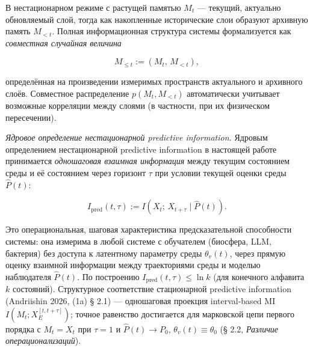 \documentclass[pdflatex,sn-mathphys-ay]{sn-jnl}
\providecommand{\lt}{<}\providecommand{\gt}{>}
\begin{document}
В нестационарном режиме с растущей памятью \(M_t\) --- текущий, актуально обновляемый слой, тогда как накопленные исторические слои образуют архивную память \(M_{\lt t}\). Полная информационная структура системы формализуется как \emph{совместная случайная величина}



\[M_{\le t} := (M_t,\, M_{\lt t}),\]



определённая на произведении измеримых пространств актуального и архивного слоёв. Совместное распределение \(p(M_t, M_{\lt t})\) автоматически учитывает возможные корреляции между слоями (в частности, при их физическом пересечении).



\emph{Ядровое определение нестационарной predictive information.} Ядровым определением нестационарной predictive information в настоящей работе принимается \emph{одношаговая взаимная информация} между текущим состоянием среды и её состоянием через горизонт \(\tau\) при условии текущей оценки среды \(\hat P(t)\):



\begin{equation}I_{\text{pred}}(t, \tau) := I\!\left(X_t;\, X_{t+\tau} \mid \hat P(t)\right). \tag{4}\end{equation}



Это операциональная, шаговая характеристика предсказательной способности системы: она измерима в любой системе с обучателем (биосфера, LLM, бактерия) без доступа к латентному параметру среды \(\theta_v(t)\), через прямую оценку взаимной информации между траекториями среды и моделью наблюдателя \(\hat P(t)\). По построению \(I_{\text{pred}}(t, \tau) \le \ln k\) (для конечного алфавита \(k\) состояний). Структурное соответствие стационарной predictive information (Andriishin 2026, (1a) § 2.1) --- одношаговая проекция interval-based MI \(I(M_t; X_E^{[t,t+\tau]})\); точное равенство достигается для марковской цепи первого порядка с \(M_t = X_t\) при \(\tau = 1\) и \(\hat P(t) \to P_0\), \(\theta_v(t) \equiv \theta_0\) (§ 2.2, \emph{Различие операционализаций}).
\end{document}
